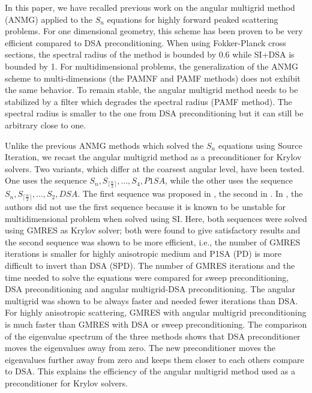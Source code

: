 \documentclass[preprint,10pt]{elsarticle}
\renewcommand{\(}{\left(}
\renewcommand{\)}{\right)}
\renewcommand{\[}{\left[}
\renewcommand{\]}{\right]}
\begin{document}
In this paper, we have recalled previous work on the angular multigrid
method (ANMG) applied to the $S_n$ equations for highly forward peaked scattering problems. 
For one dimensional geometry, this scheme has been proven to be very 
efficient compared to DSA preconditioning. When using Fokker-Planck cross sections, the
spectral radius of the method is bounded by 0.6 while SI+DSA is bounded by 1. 
For multidimensional problems, the generalization of the ANMG scheme to multi-dimensions (the
PAMNF and PAMF methods) does not exhibit the same behavior. To remain stable, the angular 
multigrid method needs to be stabilized
by a filter which degrades the spectral radius (PAMF method). The spectral radius is smaller 
to the one from  DSA preconditioning but it can still be arbitrary close to one. 

Unlike the previous ANMG methods which solved the $S_n$ equations using  Source 
Iteration, we recast the angular multigrid method as a preconditioner 
for Krylov solvers. Two variants, which differ at the coarsest angular level,
have been tested. One uses the sequence $S_n,S_{\lceil\frac{n}{2}\rceil},
\hdots,S_4,P1SA$, while the other uses the sequence $S_n,
S_{\lceil\frac{n}{2}\rceil},\hdots,S_2,DSA$.
The first sequence was proposed in \cite{multigrid_1d}, the second in 
\cite{multigrid_2d}. In \cite{multigrid_2d}, the authors did not use the first
sequence because it is known to be unstable for multidimensional problem when 
solved  using SI. Here, both sequences were solved using GMRES as Krylov solver; 
both were found to give satisfactory results and the second sequence was shown to be more 
efficient, i.e., the number of GMRES iterations is smaller for highly 
anisotropic medium and P1SA (PD) is more difficult to invert than
DSA (SPD). The number of GMRES iterations and the time needed
to solve the equations were compared for sweep preconditioning, DSA
preconditioning and angular multigrid-DSA preconditioning. The angular
multigrid was shown to be always faster and needed fewer iterations than DSA.
For highly anisotropic scattering, GMRES with angular multigrid
preconditioning is much faster than GMRES with DSA or sweep preconditioning.
The comparison of the eigenvalue spectrum of the three methods shows that 
DSA preconditioner moves the eigenvalues away from zero. The new
preconditioner moves the eigenvalues further away from zero and keeps them
closer to each others compare to DSA. This explains the
efficiency of the angular multigrid method used as a preconditioner for Krylov solvers.
\end{document}
